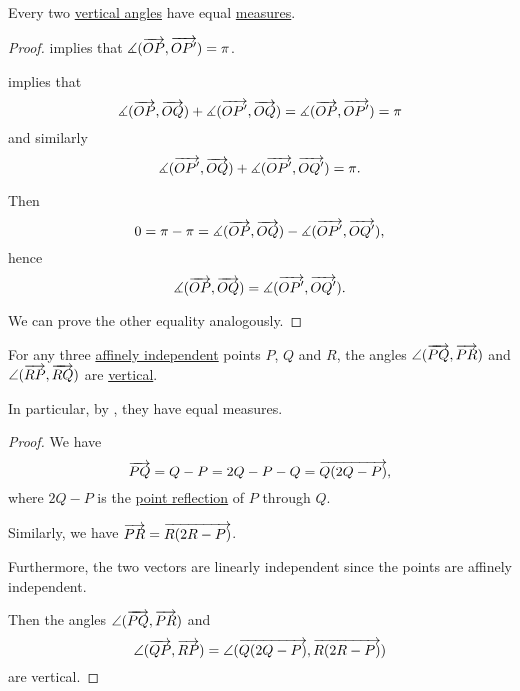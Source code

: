 \begin{proposition}\label{thm:vertical_angles_are_equal}
  Every two \hyperref[def:vertical_angles]{vertical angles} have equal \hyperref[def:angle/measure]{measures}.
\end{proposition}
\begin{proof}
   implies that \( \measuredangle(\overrightarrow{OP}, \overrightarrow{OP'}) = \pi \).

   implies that
  \begin{equation*}
    \measuredangle(\overrightarrow{OP}, \overrightarrow{OQ}) + \measuredangle(\overrightarrow{OP'}, \overrightarrow{OQ}) = \measuredangle(\overrightarrow{OP}, \overrightarrow{OP'}) = \pi
  \end{equation*}
  and similarly
  \begin{equation*}
    \measuredangle(\overrightarrow{OP'}, \overrightarrow{OQ}) + \measuredangle(\overrightarrow{OP'}, \overrightarrow{OQ'}) = \pi.
  \end{equation*}

  Then
  \begin{equation*}
    0 = \pi - \pi = \measuredangle(\overrightarrow{OP}, \overrightarrow{OQ}) - \measuredangle(\overrightarrow{OP'}, \overrightarrow{OQ'}),
  \end{equation*}
  hence
  \begin{equation*}
    \measuredangle(\overrightarrow{OP}, \overrightarrow{OQ}) = \measuredangle(\overrightarrow{OP'}, \overrightarrow{OQ'}).
  \end{equation*}

  We can prove the other equality analogously.
\end{proof}

\begin{proposition}\label{thm:angle_with_inverse_vectors}
  For any three \hyperref[def:affine_dependence]{affinely independent} points \( P \), \( Q \) and \( R \), the angles \( \angle(\overrightarrow{PQ}, \overrightarrow{PR}) \) and \( \angle(\overrightarrow{RP}, \overrightarrow{RQ}) \) are \hyperref[def:vertical_angles]{vertical}.
\end{proposition}
\begin{comments}
  \item In particular, by , they have equal measures.
\end{comments}
\begin{proof}
  We have
  \begin{equation*}
    \overrightarrow{PQ} = Q - P = 2Q - P - Q = \overrightarrow{Q(2Q - P)},
  \end{equation*}
  where \( 2Q - P \) is the \hyperref[def:rigid_motion/point_reflection]{point reflection} of \( P \) through \( Q \).

  Similarly, we have \( \overrightarrow{PR} = \overrightarrow{R(2R - P)} \).

  Furthermore, the two vectors are linearly independent since the points are affinely independent.

  Then the angles \( \angle(\overrightarrow{PQ}, \overrightarrow{PR}) \) and
  \begin{equation*}
    \angle(\overrightarrow{QP}, \overrightarrow{RP}) = \angle(\overrightarrow{Q(2Q - P)}, \overrightarrow{R(2R - P)})
  \end{equation*}
  are vertical.
\end{proof}

